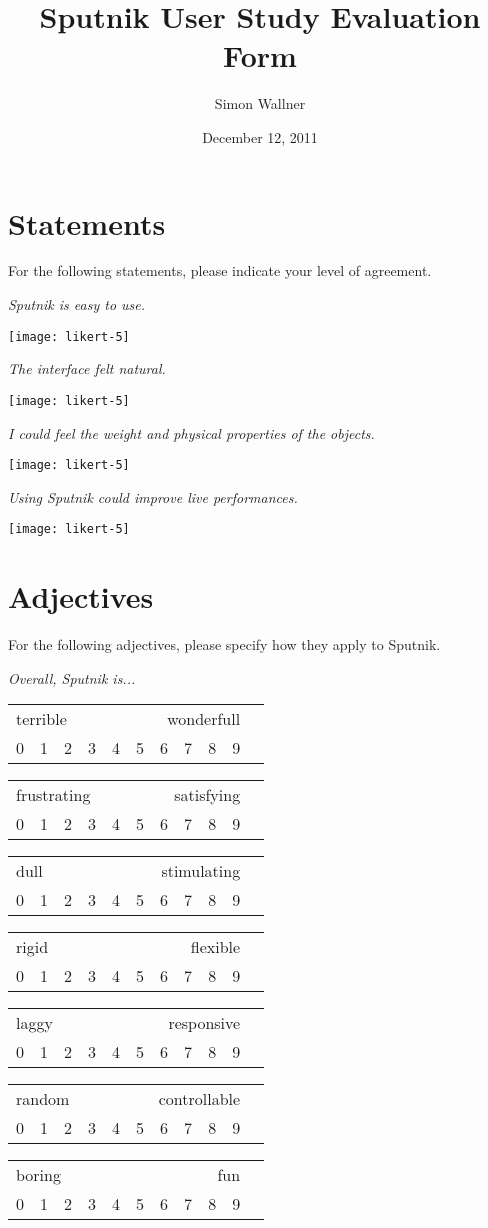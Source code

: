 \documentclass[10pt,a4paper]{scrartcl}
\title{Sputnik User Study Evaluation Form}
\author{Simon Wallner}
\date{December 12, 2011}
\newcommand{\likert}[1]{
\emph{#1}
\begin{center}
\texttt{[image: likert-5]}
\end{center}
}
\newcommand{\quis}[3]{
\emph{#1}
\quisshort{#2}{#3}
}
\newcommand{\quisshort}[2]{
\begin{center}
\begin{tabular}{c c c c c c c c c c c}
\multicolumn{5}{l}{\textsf{#1}} & \multicolumn{5}{r}{\textsf{#2}}\\
0 & 1 & 2 & 3 & 4 & 5 & 6 & 7 & 8 & 9\\
\end{tabular}
\end{center}
}
\begin{document}
\maketitle



\section{Statements}
For the following statements, please indicate your level of agreement.
\medskip

\likert{Sputnik is easy to use.}

\likert{The interface felt natural.}

\likert{I could feel the weight and physical properties of the objects.}

\likert{Using Sputnik could improve live performances.}


\section{Adjectives}
For the following adjectives, please specify how they apply to Sputnik.
\medskip


\quis{Overall, Sputnik is...}{terrible}{wonderfull}
\quisshort{frustrating}{satisfying}
\quisshort{dull}{stimulating}
\quisshort{rigid}{flexible}
\quisshort{laggy}{responsive}
\quisshort{random}{controllable}
\quisshort{boring}{fun}
\end{document}
